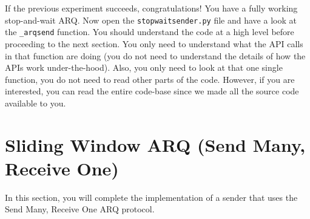 \documentclass[11pt]{article}
\begin{document}




If the previous experiment succeeds, congratulations! You have a fully working stop-and-wait ARQ.
Now open the \texttt{stopwaitsender.py} file and have a look at the \texttt{\_arqsend} function.
You should understand the code at a high level before proceeding to the next section.
You only need to understand what the API calls in that function are doing (you do not need to understand the details of how the APIs work under-the-hood).
Also, you only need to look at that one single function, you do not need to read other parts of the code.
However, if you are interested, you can read the entire code-base since we made all the source code available to you.

\section{Sliding Window ARQ (Send Many, Receive One)}
\label{sec:sliding}
In this section, you will complete the implementation of a sender that uses the Send Many, Receive One ARQ protocol.
\end{document}

